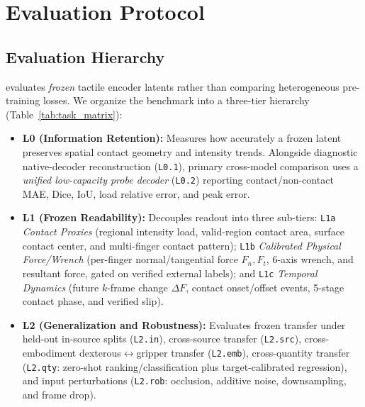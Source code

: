 \section{Evaluation Protocol}
\label{sec:benchmark}

\subsection{Evaluation Hierarchy}
\label{sec:taxonomy}
\bench{} evaluates \emph{frozen} tactile encoder latents rather than comparing heterogeneous pre-training losses.
We organize the benchmark into a three-tier hierarchy (Table~\ref{tab:task_matrix}):
\begin{itemize}[leftmargin=*,nosep]
    \item \textbf{L0 (Information Retention):} Measures how accurately a frozen latent preserves spatial contact geometry and intensity trends. Alongside diagnostic native-decoder reconstruction (\texttt{L0.1}), primary cross-model comparison uses a \emph{unified low-capacity probe decoder} (\texttt{L0.2}) reporting contact/non-contact MAE, Dice, IoU, load relative error, and peak error.
    \item \textbf{L1 (Frozen Readability):} Decouples readout into three sub-tiers:
    \texttt{L1a} \emph{Contact Proxies} (regional intensity load, valid-region contact area, surface contact center, and multi-finger contact pattern);
    \texttt{L1b} \emph{Calibrated Physical Force/Wrench} (per-finger normal/tangential force $F_n, F_t$, 6-axis wrench, and resultant force, gated on verified external labels); and
    \texttt{L1c} \emph{Temporal Dynamics} (future $k$-frame change $\Delta F$, contact onset/offset events, 5-stage contact phase, and verified slip).
    \item \textbf{L2 (Generalization and Robustness):} Evaluates frozen transfer under held-out in-source splits (\texttt{L2.in}), cross-source transfer (\texttt{L2.src}), cross-embodiment dexterous$\leftrightarrow$gripper transfer (\texttt{L2.emb}), cross-quantity transfer (\texttt{L2.qty}: zero-shot ranking/classification plus target-calibrated regression), and input perturbations (\texttt{L2.rob}: occlusion, additive noise, downsampling, and frame drop).
\end{itemize}

